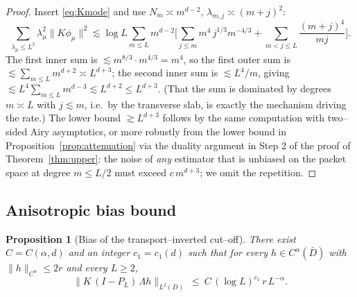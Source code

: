 \documentclass[11pt]{article}
\newtheorem{proposition}[theorem]{Proposition}
\newcommand{\1}{\mathbf{1}}
\newcommand{\norm}[1]{\lVert #1\rVert}
\begin{document}
\begin{proof}
Insert \eqref{eq:Kmode} and use $N_m\asymp m^{d-2}$, $\lambda_{m,j}\asymp(m+j)^2$:
\[
\sum_{\lambda_\mu\le L^2}\lambda_\mu^2\norm{K\phi_\mu}^2
\lesssim\log L\sum_{m\le L}m^{d-2}\Big[\sum_{j\le m}m^4\, j^{1/3}m^{-4/3}
+\sum_{m<j\le L}\frac{(m+j)^4}{mj}\Big].
\]
The first inner sum is $\lesssim m^{8/3}\cdot m^{4/3}=m^4$, so the first outer sum is
$\lesssim\sum_{m\le L}m^{d+2}\asymp L^{d+3}$; the second inner sum is
$\lesssim L^4/m$, giving $\lesssim L^4\sum_{m\le L}m^{d-3}\lesssim L^{d+2}\le L^{d+3}$.
(That the sum is dominated by degrees $m\asymp L$ with $j\lesssim m$, i.e.\ by the
transverse slab, is exactly the mechanism driving the rate.) The lower bound
$\gtrsim L^{d+3}$ follows by the same computation with two--sided Airy asymptotics, or
more robustly from the lower bound in Proposition~\ref{prop:attenuation} via the
duality argument in Step 2 of the proof of Theorem~\ref{thm:upper}: the noise of
\emph{any} estimator that is unbiased on the packet space at degree $m\le L/2$ must
exceed $c\,m^{d+3}$; we omit the repetition.
\end{proof}

\subsection{Anisotropic bias bound}

\begin{proposition}[Bias of the transport--inverted cut--off]\label{prop:bias}
There exist $C=C(\alpha,d)$ and an integer $c_1=c_1(d)$ such that for every
$h\in C^\alpha(\bar D)$ with $\norm h_{C^\alpha}\le 2r$ and every $L\ge2$,
\begin{equation}\label{eq:bias}
\norm{K\,(I-P_L)\,\Lambda h}_{L^2(D)}\ \le\ C\,(\log L)^{c_1}\,r\,L^{-\alpha}.
\end{equation}
\end{proposition}
\end{document}

